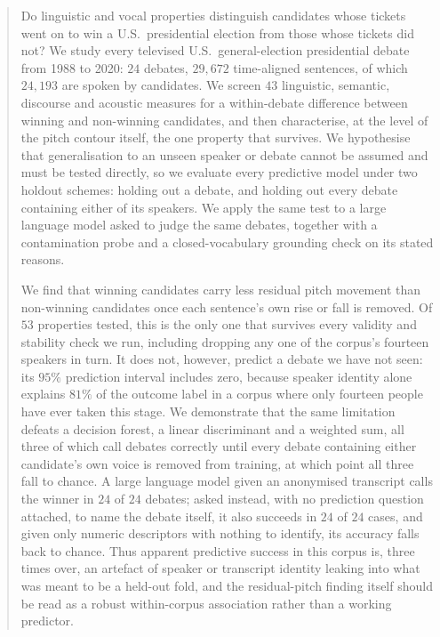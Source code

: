 \documentclass[journal]{IEEEtran}
\begin{document}
\begin{abstract}
Do linguistic and vocal properties distinguish candidates whose tickets went
on to win a U.S.\ presidential election from those whose tickets did not? We
study every televised U.S.\ general-election presidential debate from 1988 to
2020: $24$ debates, $29{,}672$ time-aligned sentences, of which $24{,}193$ are
spoken by candidates. We screen $43$ linguistic, semantic, discourse and
acoustic measures for a within-debate difference between winning and
non-winning candidates, and then characterise, at the level of the pitch
contour itself, the one property that survives. We hypothesise that
generalisation to an unseen speaker or debate cannot be assumed and must be
tested directly, so we evaluate every predictive model under two holdout
schemes: holding out a debate, and holding out every debate containing either
of its speakers. We apply the same test to a large language model asked to
judge the same debates, together with a contamination probe and a
closed-vocabulary grounding check on its stated reasons.

We find that winning candidates carry less residual pitch movement than
non-winning candidates once each sentence's own rise or fall is removed. Of
$53$ properties tested, this is the only one that survives every validity and
stability check we run, including dropping any one of the corpus's fourteen
speakers in turn. It does not, however, predict a debate we have not seen:
its $95\%$ prediction interval includes zero, because speaker identity alone
explains $81\%$ of the outcome label in a corpus where only fourteen people
have ever taken this stage. We demonstrate that the same limitation defeats a
decision forest, a linear discriminant and a weighted sum, all three of which
call debates correctly until every debate containing either candidate's own
voice is removed from training, at which point all three fall to chance. A
large language model given an anonymised transcript calls the winner in
$24$ of $24$ debates; asked instead, with no prediction question attached, to
name the debate itself, it also succeeds in $24$ of $24$ cases, and given
only numeric descriptors with nothing to identify, its accuracy falls back to
chance. Thus apparent predictive success in this corpus is, three times over,
an artefact of speaker or transcript identity leaking into what was meant to
be a held-out fold, and the residual-pitch finding itself should be read as a
robust within-corpus association rather than a working predictor.
\end{abstract}
\end{document}
